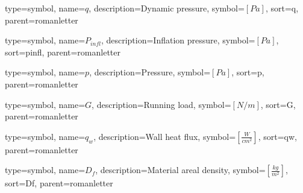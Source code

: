 {
type=symbol, %
name={\ensuremath{q}}, %
description={Dynamic pressure}, %
symbol={$\left[Pa\right]$}, %
sort=q, %
parent=romanletter %
}

{
type=symbol, %
name={\ensuremath{P_{infl}}}, %
description={Inflation pressure}, %
symbol={$\left[Pa\right]$}, %
sort=pinfl, %
parent=romanletter %
}

{
	type=symbol, %
	name={\ensuremath{p}}, %
	description={Pressure}, %
	symbol={$\left[Pa\right]$}, %
	sort=p, %
	parent=romanletter %
}

{
type=symbol, %
name={\ensuremath{G}}, %
description={Running load}, %
symbol={$\left[N/m\right]$}, %
sort=G, %
parent=romanletter %
}

{
	type=symbol, %
	name={\ensuremath{q_{w}}}, %
	description={Wall heat flux}, %
	symbol={$\left[\frac{W}{cm^{2}}\right]$}, %
	sort=qw, %
	parent=romanletter %
}

{
type=symbol, %
name={\ensuremath{D_f}}, %
description={Material areal density}, %
symbol={$\left[\frac{kg}{m^2}\right]$}, %
sort=Df, %
parent=romanletter %
}

